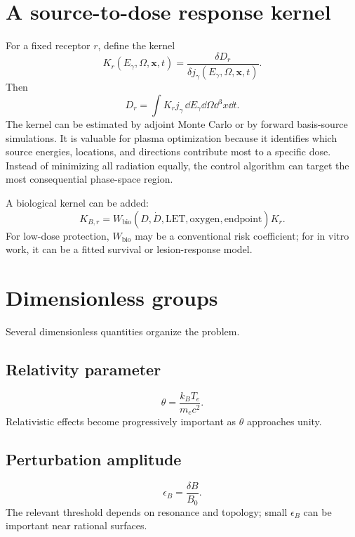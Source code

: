 \section{A source-to-dose response kernel}

For a fixed receptor $r$, define the kernel
\begin{equation}
K_r(E_\gamma,\Omega,\mathbf{x},t)
=\frac{\delta D_r}{\delta j_\gamma(E_\gamma,\Omega,\mathbf{x},t)}.
\label{eq:dose-kernel}
\end{equation}
Then
\begin{equation}
D_r=\int K_rj_\gamma\,\dd E_\gamma\dd\Omega\dd^3x\dd t.
\end{equation}
The kernel can be estimated by adjoint Monte Carlo or by forward basis-source simulations. It is valuable for plasma optimization because it identifies which source energies, locations, and directions contribute most to a specific dose. Instead of minimizing all radiation equally, the control algorithm can target the most consequential phase-space region.

A biological kernel can be added:
\begin{equation}
K_{B,r}=W_{\mathrm{bio}}(D,\dot D,\mathrm{LET},\mathrm{oxygen},\mathrm{endpoint})K_r.
\end{equation}
For low-dose protection, $W_{\mathrm{bio}}$ may be a conventional risk coefficient; for in vitro work, it can be a fitted survival or lesion-response model.

\section{Dimensionless groups}

Several dimensionless quantities organize the problem.

\subsection{Relativity parameter}
\begin{equation}
\theta=\frac{k_BT_e}{m_ec^2}.
\end{equation}
Relativistic effects become progressively important as $\theta$ approaches unity.

\subsection{Perturbation amplitude}
\begin{equation}
\epsilon_B=\frac{\delta B}{B_0}.
\end{equation}
The relevant threshold depends on resonance and topology; small $\epsilon_B$ can be important near rational surfaces.

